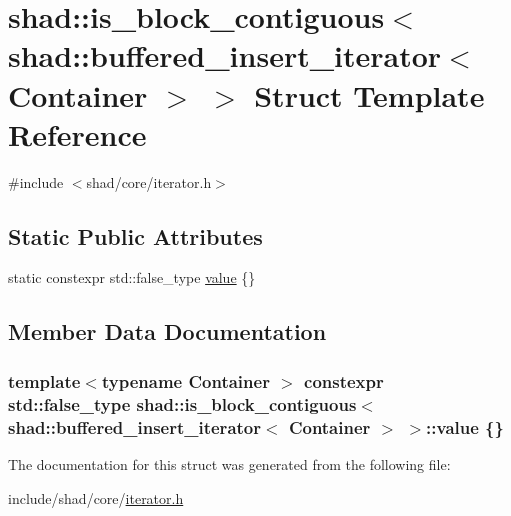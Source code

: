 \hypertarget{structshad_1_1is__block__contiguous_3_01shad_1_1buffered__insert__iterator_3_01Container_01_4_01_4}{\section{shad\-:\-:is\-\_\-block\-\_\-contiguous$<$ shad\-:\-:buffered\-\_\-insert\-\_\-iterator$<$ Container $>$ $>$ Struct Template Reference}
\label{structshad_1_1is__block__contiguous_3_01shad_1_1buffered__insert__iterator_3_01Container_01_4_01_4}
}


{\ttfamily \#include $<$shad/core/iterator.\-h$>$}

\subsection*{Static Public Attributes}
\begin{DoxyCompactItemize}
\item 
static constexpr std\-::false\-\_\-type \hyperlink{structshad_1_1is__block__contiguous_3_01shad_1_1buffered__insert__iterator_3_01Container_01_4_01_4_ae664f81d1ba1a6f009d700cbfb337f65}{value} \{\}
\end{DoxyCompactItemize}


\subsection{Member Data Documentation}
\hypertarget{structshad_1_1is__block__contiguous_3_01shad_1_1buffered__insert__iterator_3_01Container_01_4_01_4_ae664f81d1ba1a6f009d700cbfb337f65}{
\subsubsection[{value}]{\setlength{\rightskip}{0pt plus 5cm}template$<$typename Container $>$ constexpr std\-::false\-\_\-type {\bf shad\-::is\-\_\-block\-\_\-contiguous}$<$ {\bf shad\-::buffered\-\_\-insert\-\_\-iterator}$<$ Container $>$ $>$\-::value \{\}\hspace{0.3cm}{\ttfamily [static]}}}\label{structshad_1_1is__block__contiguous_3_01shad_1_1buffered__insert__iterator_3_01Container_01_4_01_4_ae664f81d1ba1a6f009d700cbfb337f65}


The documentation for this struct was generated from the following file\-:\begin{DoxyCompactItemize}
\item 
include/shad/core/\hyperlink{iterator_8h}{iterator.\-h}\end{DoxyCompactItemize}
